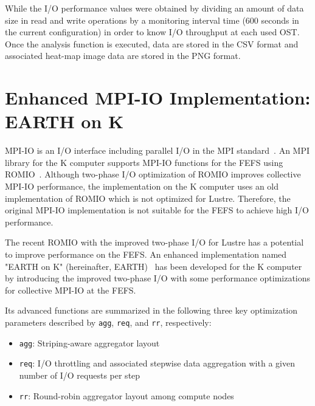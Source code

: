 \documentclass{jhps}
\begin{document}
While the I/O performance values were obtained by dividing an amount of data size
in read and write operations by a monitoring
interval time (600 seconds in the current configuration) in order to know
I/O throughput at each used OST.
Once the analysis function is executed, data are stored in the CSV format
and associated heat-map image data are stored in the PNG format.

\section{Enhanced MPI-IO Implementation: EARTH on K}
\label{sec:EARTH}

MPI-IO is an I/O interface including parallel I/O in the MPI standard~\cite{mpi-forum:web}.
An MPI library for the K computer supports MPI-IO functions for the FEFS
using ROMIO~\cite{thakur:romio}.
Although two-phase I/O optimization of ROMIO improves collective MPI-IO performance,
the implementation on the K computer uses an old implementation of ROMIO
which is not optimized for Lustre.
Therefore, the original MPI-IO implementation is not suitable
for the FEFS to achieve high I/O performance.

The recent ROMIO with the improved two-phase I/O for Lustre has a potential
to improve performance on the FEFS.
An enhanced implementation named "EARTH on K"
(hereinafter, EARTH)~\cite{tsujita:WS_EuroMPI2014,tsujita:hpcasia18}
has been developed for the K computer by introducing
the improved two-phase I/O with some performance optimizations
for collective MPI-IO at the FEFS.

Its advanced functions are summarized in the following three key optimization parameters
described by {\tt agg}, {\tt req}, and {\tt rr}, respectively:
%
\begin{itemize}
\item {\tt agg}: Striping-aware aggregator layout
\item {\tt req}: I/O throttling and associated stepwise data aggregation
with a given number of I/O requests per step
\item {\tt rr}: Round-robin aggregator layout among compute nodes
\end{itemize}
%
\end{document}
